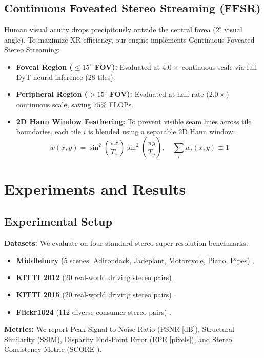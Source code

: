 \documentclass[10pt,journal,compsoc]{IEEEtran}
\begin{document}
\subsection{Continuous Foveated Stereo Streaming (FFSR)}
Human visual acuity drops precipitously outside the central fovea ($2^\circ$ visual angle). To maximize XR efficiency, our engine implements Continuous Foveated Stereo Streaming:
\begin{itemize}
    \item \textbf{Foveal Region ($\le 15^\circ$ FOV):} Evaluated at $4.0\times$ continuous scale via full DyT neural inference ($28$ tiles).
    \item \textbf{Peripheral Region ($> 15^\circ$ FOV):} Evaluated at half-rate ($2.0\times$) continuous scale, saving $75\%$ FLOPs.
    \item \textbf{2D Hann Window Feathering:} To prevent visible seam lines across tile boundaries, each tile $i$ is blended using a separable 2D Hann window:
    \begin{equation}
    w(x, y) = \sin^2\left(\frac{\pi x}{T_x}\right) \sin^2\left(\frac{\pi y}{T_y}\right), \quad \sum_{i} w_i(x, y) \equiv 1
    \end{equation}
\end{itemize}

\section{Experiments and Results}

\subsection{Experimental Setup}
\noindent \textbf{Datasets:} We evaluate on four standard stereo super-resolution benchmarks:
\begin{itemize}
    \item \textbf{Middlebury} (5 scenes: Adirondack, Jadeplant, Motorcycle, Piano, Pipes) \cite{middlebury2014}.
    \item \textbf{KITTI 2012} (20 real-world driving stereo pairs) \cite{kitti2012}.
    \item \textbf{KITTI 2015} (20 real-world driving stereo pairs) \cite{kitti2015}.
    \item \textbf{Flickr1024} (112 diverse consumer stereo pairs) \cite{flickr1024}.
\end{itemize}

\noindent \textbf{Metrics:} We report Peak Signal-to-Noise Ratio (PSNR [dB]), Structural Similarity (SSIM), Disparity End-Point Error (EPE [pixels]), and Stereo Consistency Metric (SCORE \cite{stereoinr2025}).
\end{document}
